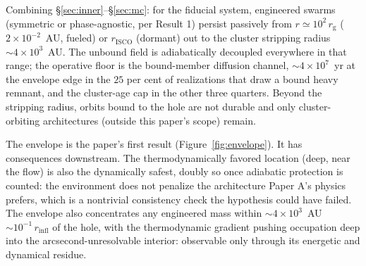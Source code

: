 \documentclass[11pt]{article}
\newcommand{\rg}{\ensuremath{r_{\mathrm{g}}}}
\begin{document}
Combining \S\ref{sec:inner}--\S\ref{sec:mc}: for the fiducial system, engineered swarms (symmetric or phase-agnostic, per Result 1) persist passively from $r \simeq 10^{2}\,\rg$ ($2\times10^{-2}$~AU, fueled) or $r_{\mathrm{ISCO}}$ (dormant) out to the cluster stripping radius $\sim 4\times10^{3}$~AU. The unbound field is adiabatically decoupled everywhere in that range; the operative floor is the bound-member diffusion channel, $\sim 4\times10^{7}$~yr at the envelope edge in the $25$ per cent of realizations that draw a bound heavy remnant, and the cluster-age cap in the other three quarters. Beyond the stripping radius, orbits bound to the hole are not durable and only cluster-orbiting architectures (outside this paper's scope) remain.

The envelope is the paper's first result (Figure~\ref{fig:envelope}). It has consequences downstream. The thermodynamically favored location (deep, near the flow) is also the dynamically safest, doubly so once adiabatic protection is counted: the environment does not penalize the architecture Paper A's physics prefers, which is a nontrivial consistency check the hypothesis could have failed. The envelope also concentrates any engineered mass within $\sim 4\times10^{3}$~AU $\sim 10^{-1}\,r_{\mathrm{infl}}$ of the hole, with the thermodynamic gradient pushing occupation deep into the arcsecond-unresolvable interior: observable only through its energetic and dynamical residue.
\end{document}
